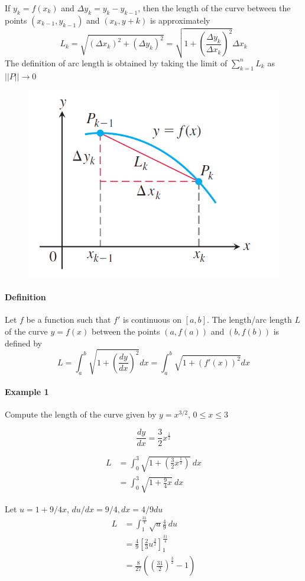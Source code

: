 \documentclass[12pt]{article}
\begin{document}
If $y_k = f(x_k)$ and $\Delta y_k = y_k - y_{k-1}$, then the length of the curve between the points
$(x_{k-1}, y_{k-1})$ and $(x_k, y+k)$ is approximately 
\[
    L_k = \sqrt{(\Delta x_k)^2 + (\Delta y_k)^2} = \sqrt{1 + \left(\frac{\Delta y_k}{\Delta x_k}  \right)^2} \Delta x_k
\]
The definition of arc length is obtained by taking the limit of $\sum_{k = 1}^n L_k$ as $||P|| \to 0$

\begin{figure}[H]
     \centering
     \includegraphics[width = 0.4\linewidth]{Images/arc length.png}
\end{figure}
\paragraph{Definition}
Let $f$ be a function such that $f'$ is continuous on $[a, b]$. The length/arc length $L$ of the curve $y = f(x)$ between the
points $(a, f(a))$ and $(b, f(b))$ is defined by
\[
    L = \int_a^b \sqrt{1 + \left(\frac{dy}{dx} \right)^2} dx = \int_a^b \sqrt{1 + (f'(x))^2} dx
\]

\paragraph{Example 1} Compute the length of the curve given by $y = x^{3/2}$, $0 \leq x \leq 3$

\[
    \frac{dy}{dx} = \frac{3}{2} x^{\frac{1}{2}}
\]

\begin{align*} 
    L &= \int_0^3 \sqrt{1 + \left( \frac{3}{2} x^{\frac{1}{2}} \right)}\:  dx \\
    &= \int_0^3 \sqrt{1 + \frac{9}{4}x}\: dx
\end{align*}

Let $u = 1 + 9/4 x$, $du/dx = 9/4, dx = 4/9 du$
\begin{align*} 
    L &= \int_1^{\frac{31}{4}} \sqrt{u} \frac{4}{9}\: du \\
    &= \frac{4}{9} \left[ \frac{2}{3} u^{\frac{3}{2}} \right]_1^{\frac{31}{4}} \\
    &= \frac{8}{27} \left( \left( \frac{31}{2} \right)^{\frac{3}{2}} - 1 \right)
\end{align*}
\end{document}
